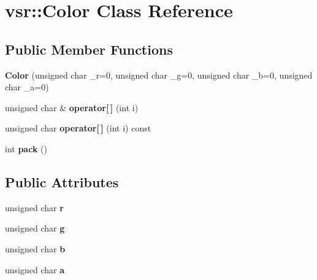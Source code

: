 \hypertarget{classvsr_1_1_color}{\section{vsr\-:\-:Color Class Reference}
\label{classvsr_1_1_color}
}
\subsection*{Public Member Functions}
\begin{DoxyCompactItemize}
\item 
\hypertarget{classvsr_1_1_color_aae0888b65785084109e4fffac4e3d217}{{\bfseries Color} (unsigned char \-\_\-r=0, unsigned char \-\_\-g=0, unsigned char \-\_\-b=0, unsigned char \-\_\-a=0)}\label{classvsr_1_1_color_aae0888b65785084109e4fffac4e3d217}

\item 
\hypertarget{classvsr_1_1_color_a68bf02c6490ac158845237f6dcafc6f8}{unsigned char \& {\bfseries operator\mbox{[}$\,$\mbox{]}} (int i)}\label{classvsr_1_1_color_a68bf02c6490ac158845237f6dcafc6f8}

\item 
\hypertarget{classvsr_1_1_color_a5c02021592a2abea562be917d2a70504}{unsigned char {\bfseries operator\mbox{[}$\,$\mbox{]}} (int i) const }\label{classvsr_1_1_color_a5c02021592a2abea562be917d2a70504}

\item 
\hypertarget{classvsr_1_1_color_ab5abf09085d807255266e2f109db24dc}{int {\bfseries pack} ()}\label{classvsr_1_1_color_ab5abf09085d807255266e2f109db24dc}

\end{DoxyCompactItemize}
\subsection*{Public Attributes}
\begin{DoxyCompactItemize}
\item 
\hypertarget{classvsr_1_1_color_a4df58f51e0f54b3c769770502389d28f}{unsigned char {\bfseries r}}\label{classvsr_1_1_color_a4df58f51e0f54b3c769770502389d28f}

\item 
\hypertarget{classvsr_1_1_color_a0df20eb02e5f92cd8b33d508eac66465}{unsigned char {\bfseries g}}\label{classvsr_1_1_color_a0df20eb02e5f92cd8b33d508eac66465}

\item 
\hypertarget{classvsr_1_1_color_a287d22f579ba42ac1da8833ad36b7cb0}{unsigned char {\bfseries b}}\label{classvsr_1_1_color_a287d22f579ba42ac1da8833ad36b7cb0}

\item 
\hypertarget{classvsr_1_1_color_ad409486f320673d50d8bfe81548d612d}{unsigned char {\bfseries a}}\label{classvsr_1_1_color_ad409486f320673d50d8bfe81548d612d}

\end{DoxyCompactItemize}
